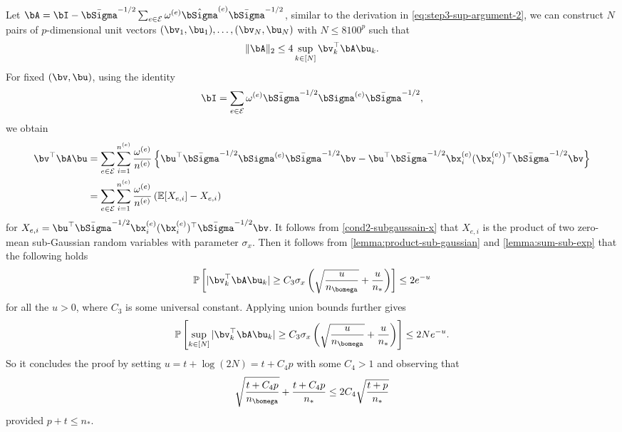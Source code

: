 \documentclass[10pt]{article}
\numberwithin{equation}{section}
\begin{document}
 Let $\bA = \bI - \bar{\bSigma}^{-1/2} \sum_{e\in \mathcal{E}} \omega^{(e)}\hat{\bSigma}^{(e)} \bar{\bSigma}^{-1/2}$, similar to the derivation in \eqref{eq:step3-sup-argument-2}, we can construct $N$ pairs of $p$-dimensional unit vectors $(\bv_1, \bu_1),\ldots, (\bv_N, \bu_N)$ with $N\le 8100^p$ such that
\begin{align*}
    \|\bA\|_2 \le 4\sup_{k\in [N]} \bv_k^\top \bA \bu_k.
\end{align*} For fixed $(\bv, \bu)$, using the identity
\begin{align*}
    \bI = \sum_{e\in \mathcal{E}} \omega^{(e)} \bar{\bSigma}^{-1/2} \bSigma^{(e)} \bar{\bSigma}^{-1/2},
\end{align*} we obtain
\begin{align*}
    \bv^\top \bA \bu &= \sum_{e\in \mathcal{E}} \sum_{i=1}^{n^{(e)}} \frac{\omega^{(e)}}{n^{(e)}} \left\{\bu^\top \bar{\bSigma}^{-1/2} \bSigma^{(e)} \bar{\bSigma}^{-1/2} \bv - \bu^\top \bar{\bSigma}^{-1/2} \bx^{(e)}_i (\bx^{(e)}_i)^\top \bar{\bSigma}^{-1/2} \bv \right\} \\ 
    &= \sum_{e\in \mathcal{E}} \sum_{i=1}^{n^{(e)}} \frac{\omega^{(e)}}{n^{(e)}} \left(\mathbb{E}[X_{e,i}] - X_{e,i}\right)
\end{align*} for $X_{e,i} = \bu^\top \bar{\bSigma}^{-1/2} \bx^{(e)}_i (\bx^{(e)}_i)^\top \bar{\bSigma}^{-1/2} \bv$. It follows from \cref{cond2-subgaussain-x} that $X_{e,i}$ is the product of two zero-mean sub-Gaussian random variables with parameter $\sigma_x$. Then it follows from \cref{lemma:product-sub-gaussian} and \cref{lemma:sum-sub-exp} that the following holds
\begin{align*}
    \mathbb{P}\left[|\bv_k^\top \bA \bu_k| \ge C_3 \sigma_x \left(\sqrt{\frac{u}{n_{\bomega}}} + \frac{u}{n_*}\right)\right] \le 2e^{-u}
\end{align*} for all the $u>0$, where $C_3$ is some universal constant. Applying union bounds further gives
\begin{align*}
    \mathbb{P}\left[\sup_{k\in [N]} |\bv_k^\top \bA \bu_k| \ge C_3 \sigma_x \left(\sqrt{\frac{u}{n_{\bomega}}} + \frac{u}{n_*}\right)\right] \le 2Ne^{-u}.
\end{align*} So it concludes the proof by setting $u=t+\log(2N) = t+C_4 p$ with some $C_4 > 1$ and observing that
\begin{align*}
    \sqrt{\frac{t + C_4 p}{n_{\bomega}}} + \frac{t + C_4 p}{n_*} \le 2C_4 \sqrt{\frac{t + p}{n_*}}
\end{align*} provided $p + t\le n_*$.
\end{document}
